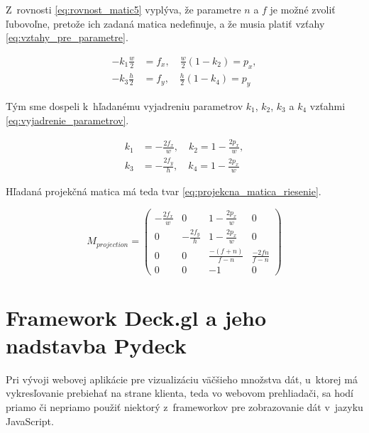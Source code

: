 Z~rovnosti \ref{eq:rovnost_matic5} vyplýva, že parametre $n$ a $f$ je možné zvoliť ľubovoľne, pretože ich zadaná matica nedefinuje, a že musia platiť vzťahy \ref{eq:vztahy_pre_parametre}.

\begin{equation}
\begin{aligned}
-k_1 \frac{w}{2} &= f_x 
\mathrm{,} \quad
\frac{w}{2} (1 - k_2) = p_x \mathrm{,}
\\
-k_3 \frac{h}{2} &= f_y
\mathrm{,} \quad
\frac{h}{2} (1 - k_4) = p_y
\label{eq:vztahy_pre_parametre}
\end{aligned}
\end{equation}

Tým sme dospeli k~hľadanému vyjadreniu parametrov $k_1$, $k_2$, $k_3$ a $k_4$ vzťahmi \ref{eq:vyjadrenie_parametrov}.

\begin{equation}
\begin{aligned}
k_1 &= - \frac{2 f_x}{w}
\mathrm{,} \quad
k_2 = 1 - \frac{2 p_x}{w} \mathrm{,} \\
k_3 &= - \frac{2 f_y}{h}
\mathrm{,} \quad
k_4 = 1 - \frac{2 p_x}{w}
\label{eq:vyjadrenie_parametrov}
\end{aligned}
\end{equation}

Hľadaná projekčná matica má teda tvar \ref{eq:projekcna_matica_riesenie}.

\begin{equation}
M_{projection}
=
\begin{pmatrix}
- \frac{2 f_x}{w} & 0 & 1 - \frac{2 p_x}{w} & 0 \\
0 & - \frac{2 f_y}{h} & 1 - \frac{2 p_x}{w} & 0 \\
0 & 0 & \frac{-(f+n)}{f-n} & \frac{-2fn}{f-n} \\
0 & 0 & -1 & 0
\end{pmatrix}
\label{eq:projekcna_matica_riesenie}
\end{equation}

\section{Framework Deck.gl a jeho nadstavba Pydeck}
\label{sec:deck_gl}

Pri vývoji webovej aplikácie pre vizualizáciu väčšieho množstva dát, u~ktorej má vykresľovanie prebiehať na strane klienta, teda vo webovom prehliadači, sa hodí priamo či nepriamo použiť niektorý z~frameworkov pre zobrazovanie dát v~jazyku JavaScript.

